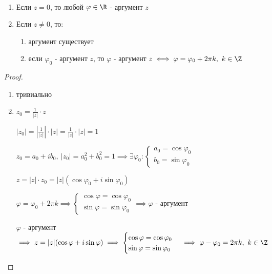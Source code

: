 \begin{theorem-non}~
    \begin{enumerate}
        \item Если $z = 0$, то любой $\varphi \in \R$ - аргумент $z$
        
        \item Если $z \neq 0$, то:
        \begin{enumerate}
            \item аргумент существует
            
            \item если $\varphi_0$ - аргумент $z$, то $\varphi$ - аргумент $z \iff \varphi = \varphi_0 + 2 \pi k,~k \in \Z$
        \end{enumerate}
    \end{enumerate}
\end{theorem-non}

\begin{proof}
    \begin{enumerate}
        \item тривиально
        
        \item $z_0 = \frac{1}{|z|} \cdot z$ 
        
        $|z_0| = \left| \frac{1}{|z|} \right| \cdot |z| = \frac{1}{|z|} \cdot |z| = 1$
        
        $z_0 = a_0 + ib_0,~|z_0| = a_0^2 + b_0^2 = 1 \implies \exists \varphi_0:
        \begin{cases}
            a_0 = \cos\varphi_0\\
            b_0 = \sin\varphi_0
        \end{cases}$

        $z = |z| \cdot z_0 = |z|(\cos\varphi_0 + i\sin\varphi_0)$

        $\varphi = \varphi_0 + 2 \pi k \implies
        \begin{cases}
            \cos\varphi = \cos\varphi_0\\
            \sin\varphi = \sin\varphi_0
        \end{cases} \implies \varphi$ - аргумент

        $\varphi$ - аргумент $\implies z = |z|(\cos\varphi + i\sin\varphi) \implies
        \begin{cases}
            \cos\varphi = \cos\varphi_0\\
            \sin\varphi = \sin\varphi_0
        \end{cases} \implies \varphi - \varphi_0 = 2 \pi k,~k \in \Z$
    \end{enumerate}
\end{proof}

